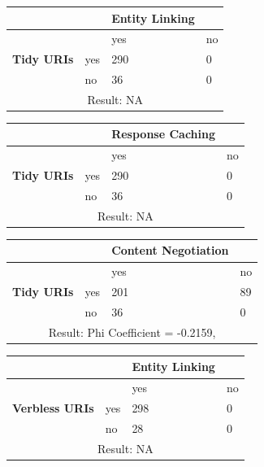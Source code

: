 \documentclass[a4paper,12pt]{article}
\begin{document}
\begin{center}
  \begin{tabular}{| p{60mm} | p{10mm} | p{35mm} | p{35mm} |}
  \hline
   & & \textbf{Entity Linking} &
  \\
  \hline
  & & yes & no
  \\
  \hline
  \textbf{Tidy URIs} & yes & 290 & 0
  \\
  \hline
   & no & 36 & 0
  \\
  \hline
  \multicolumn{4}{|c|}{Result: NA}
  \\ \hline
  \end{tabular}
  \end{center}

\begin{center}
  \begin{tabular}{| p{60mm} | p{10mm} | p{35mm} | p{35mm} |}
  \hline
   & & \textbf{Response Caching} &
  \\
  \hline
  & & yes & no
  \\
  \hline
  \textbf{Tidy URIs} & yes & 290 & 0
  \\
  \hline
   & no & 36 & 0
  \\
  \hline
  \multicolumn{4}{|c|}{Result: NA}
  \\ \hline
  \end{tabular}
  \end{center}

\begin{center}
  \begin{tabular}{| p{60mm} | p{10mm} | p{35mm} | p{35mm} |}
  \hline
   & & \textbf{Content Negotiation} &
  \\
  \hline
  & & yes & no
  \\
  \hline
  \textbf{Tidy URIs} & yes & 201 & 89
  \\
  \hline
   & no & 36 & 0
  \\
  \hline
  \multicolumn{4}{|c|}{Result: Phi Coefficient = -0.2159, }
  \\ \hline
  \end{tabular}
  \end{center}

\begin{center}
  \begin{tabular}{| p{60mm} | p{10mm} | p{35mm} | p{35mm} |}
  \hline
   & & \textbf{Entity Linking} &
  \\
  \hline
  & & yes & no
  \\
  \hline
  \textbf{Verbless URIs} & yes & 298 & 0
  \\
  \hline
   & no & 28 & 0
  \\
  \hline
  \multicolumn{4}{|c|}{Result: NA}
  \\ \hline
  \end{tabular}
  \end{center}
\end{document}
